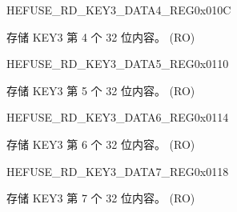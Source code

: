 \begin{register}{H}{EFUSE\_RD\_KEY3\_DATA4\_REG}{0x010C}\label{regdesc:EFUSERDKEY3DATA4REG}
%
\regnewline%
\begin{regdesc}\begin{reglist}
\label{fielddesc:EFUSEKEY3DATA4}\item [EFUSE\_KEY3\_DATA4] 存储 KEY3 第 4 个 32 位内容。 (RO)
\end{reglist}\end{regdesc}
\end{register}


\begin{register}{H}{EFUSE\_RD\_KEY3\_DATA5\_REG}{0x0110}\label{regdesc:EFUSERDKEY3DATA5REG}
%
\regnewline%
\begin{regdesc}\begin{reglist}
\label{fielddesc:EFUSEKEY3DATA5}\item [EFUSE\_KEY3\_DATA5] 存储 KEY3 第 5 个 32 位内容。 (RO)
\end{reglist}\end{regdesc}
\end{register}


\begin{register}{H}{EFUSE\_RD\_KEY3\_DATA6\_REG}{0x0114}\label{regdesc:EFUSERDKEY3DATA6REG}
%
\regnewline%
\begin{regdesc}\begin{reglist}
\label{fielddesc:EFUSEKEY3DATA6}\item [EFUSE\_KEY3\_DATA6] 存储 KEY3 第 6 个 32 位内容。 (RO)
\end{reglist}\end{regdesc}
\end{register}


\begin{register}{H}{EFUSE\_RD\_KEY3\_DATA7\_REG}{0x0118}\label{regdesc:EFUSERDKEY3DATA7REG}
%
\regnewline%
\begin{regdesc}\begin{reglist}
\label{fielddesc:EFUSEKEY3DATA7}\item [EFUSE\_KEY3\_DATA7] 存储 KEY3 第 7 个 32 位内容。 (RO)
\end{reglist}\end{regdesc}
\end{register}


